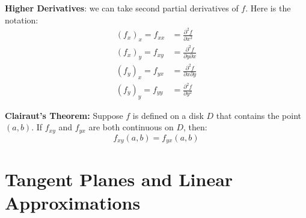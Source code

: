 \documentclass{report}
\begin{document}
\textbf{Higher Derivatives}: we can take second partial derivatives of $f$. Here is the notation:
\begin{align*}
(f_x)_x = f_{xx} &= \frac{\partial^2 f}{\partial x^2} \\
(f_x)_y = f_{xy} &= \frac{\partial^2 f}{\partial y \partial x} \\
(f_y)_x = f_{yx} &= \frac{\partial^2 f}{\partial x \partial y} \\
(f_y)_y = f_{yy} &= \frac{\partial^2 f}{\partial y^2}
\end{align*}


\begin{theorem}
\textbf{Clairaut's Theorem:} Suppose $f$ is defined on a disk $D$ that contains the 
point $(a, b)$. If $f_{xy}$ and $f_{yx}$ are both continuous on $D$, then: 
\[
f_{xy}(a, b) = f_{yx}(a, b)
\]
\end{theorem}

\section{Tangent Planes and Linear Approximations}
\end{document}
